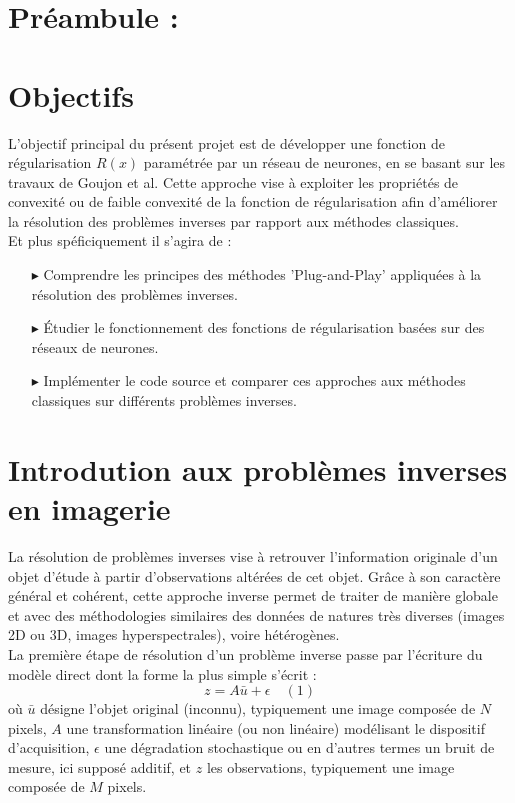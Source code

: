 \documentclass[a4paper, 12pt]{article} %
\begin{document}
\section{{\large Préambule : }}


\newpage



\section{{\large Objectifs }}
L'objectif principal du présent projet est de développer une fonction de régularisation \( R(x) \) paramétrée par un réseau de neurones, en se basant sur les travaux de Goujon et al. Cette approche vise à exploiter les propriétés de convexité ou de faible convexité de la fonction de régularisation afin d'améliorer la résolution des problèmes inverses par rapport aux méthodes classiques.\\

Et plus spéficiquement il s'agira de :
\begin{itemize}
    \item [$\blacktriangleright$] Comprendre les principes des méthodes 'Plug-and-Play' appliquées à la résolution des problèmes inverses.
    \item [$\blacktriangleright$] Étudier le fonctionnement des fonctions de régularisation basées sur des réseaux de neurones.
    \item [$\blacktriangleright$] Implémenter le code source et comparer ces approches aux méthodes classiques sur différents problèmes inverses.
\end{itemize}


\section{\large Introdution aux  problèmes inverses en imagerie}
 
La résolution de problèmes inverses vise à retrouver l'information originale d'un objet d'étude à partir d'observations altérées de cet objet. Grâce à son caractère général et cohérent, cette approche inverse permet de traiter de manière globale et avec des méthodologies similaires des données de natures très diverses (images 2D ou 3D, images hyperspectrales), voire hétérogènes. \\

La première étape de résolution d’un problème inverse passe par l’écriture du modèle direct dont la forme la plus simple s’écrit :
\[ z = A \bar{u} + \epsilon \quad (1) \]
où \( \bar{u} \) désigne l’objet original (inconnu), typiquement une image composée de \( N \) pixels, \( A \) une transformation linéaire (ou non linéaire) modélisant le dispositif d’acquisition, \( \epsilon \) une dégradation stochastique ou en d’autres termes un bruit de mesure, ici supposé additif, et \( z \) les observations, typiquement une image composée de \( M \) pixels.
\end{document}
